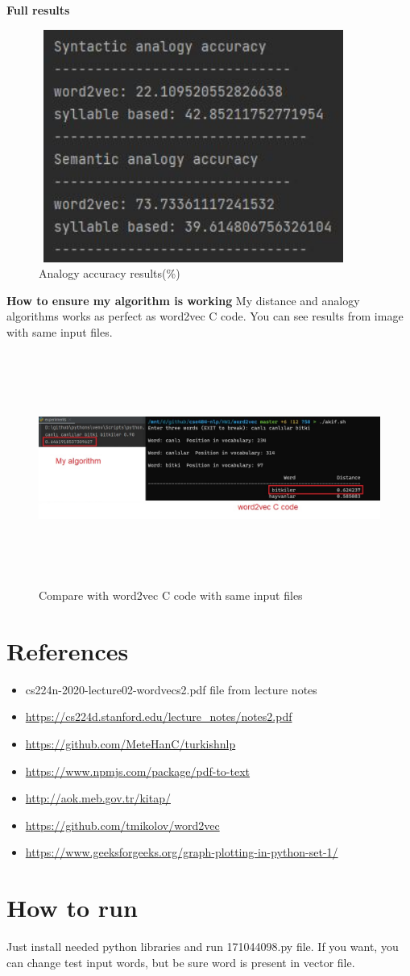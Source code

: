 \documentclass{article}
\begin{document}
\textbf{Full results}
\begin{figure}[H]
    \centering
	\includegraphics[width=4in, height=3in]{27.JPG}
	\caption[Optional caption]{Analogy accuracy results(\%)}
	\label{}
\end{figure}

\textbf{How to ensure my algorithm is working}
\newline
\newline
My distance and analogy algorithms works as perfect as word2vec C code. You can see results from image with same input files.
\begin{figure}[H]
    \centering
	\includegraphics[width=7in, height=3in]{res.png}
	\caption[Optional caption]{Compare with word2vec C code with same input files}
	\label{}
\end{figure}

\section{References} 
\begin{itemize}
	\item cs224n-2020-lecture02-wordvecs2.pdf file from lecture notes
	\item \url{https://cs224d.stanford.edu/lecture_notes/notes2.pdf}
	\item \url{https://github.com/MeteHanC/turkishnlp}
	\item \url{https://www.npmjs.com/package/pdf-to-text}
	\item \url{http://aok.meb.gov.tr/kitap/}
	\item \url{https://github.com/tmikolov/word2vec}
	\item \url{https://www.geeksforgeeks.org/graph-plotting-in-python-set-1/}
\end{itemize}
\section{How to run}
Just install needed python libraries and run 171044098.py file. If you want, you can change test input words, but be sure word is present in vector file. 
   
\end{document}
